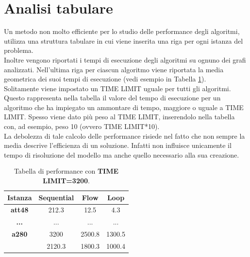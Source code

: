 \section{Analisi tabulare}
Un metodo non molto efficiente per lo studio delle performance degli algoritmi, utilizza una struttura tabulare in cui viene inserita una riga per ogni istanza del problema.\\ Inoltre vengono riportati i tempi di esecuzione degli algoritmi su ognuno dei grafi analizzati. Nell'ultima riga per ciascun algoritmo viene riportata la media geometrica dei suoi tempi di esecuzione (vedi esempio in Tabella \ref{result_table}).\\
Solitamente viene impostato un TIME LIMIT uguale per tutti gli algoritmi. Questo rappresenta nella tabella il valore del tempo di esecuzione per un algoritmo che ha impiegato un ammontare di tempo, maggiore o uguale a TIME LIMIT. Spesso viene dato più peso al TIME LIMIT, inserendolo nella tabella con, ad esempio, peso 10 (ovvero TIME LIMIT*10).\\ La debolezza di tale calcolo delle performance risiede nel fatto che non sempre la media descrive  l'efficienza di un soluzione. Infatti non influisce unicamente il tempo di risoluzione del modello ma anche quello necessario alla sua creazione. 

\begin{table}[h]
\centering
\begin{tabular}{|c|c|c|c|}
\multicolumn{1}{c}{\textbf{Istanza}} & \multicolumn{1}{c}{\textbf{Sequential}} & \multicolumn{1}{c}{\textbf{Flow}} &
\multicolumn{1}{c}{\textbf{Loop}}\\
\hline
\textbf{att48} & {212.3} & {12.5} & {4.3}\\
\hline
{\textbf{...}} & {...} & {...} & {...}\\
\hline
\textbf{a280} & {3200} & {2500.8} & {1300.5}\\
\hline
\hline
\multicolumn{1}{c}{} & \multicolumn{1}{c}{2120.3} & \multicolumn{1}{c}{1800.3}& \multicolumn{1}{c}{1000.4}\\
\end{tabular}
\caption{\footnotesize{Tabella di performance con \textbf{TIME LIMIT=3200}.}}\label{result_table}
\end{table}

